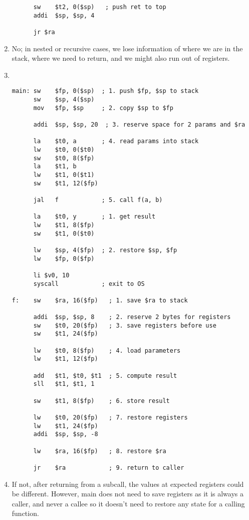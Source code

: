 \documentclass[12pt, a4paper]{article}
\begin{document}
\begin{enumerate}[Q\arabic*.]
\begin{lstlisting}
      sw    $t2, 0($sp)   ; push ret to top
      addi  $sp, $sp, 4

      jr $ra
    \end{lstlisting}

\pagebreak

  \item No; in nested or recursive cases, we lose information of where we are in the stack, where we need to return, and we might also run out of registers.

  \item \quad\\
\begin{lstlisting}
main: sw    $fp, 0($sp)  ; 1. push $fp, $sp to stack
      sw    $sp, 4($sp)  
      mov   $fp, $sp     ; 2. copy $sp to $fp 

      addi  $sp, $sp, 20  ; 3. reserve space for 2 params and $ra

      la    $t0, a       ; 4. read params into stack
      lw    $t0, 0($t0)  
      sw    $t0, 8($fp)  
      la    $t1, b 
      lw    $t1, 0($t1)  
      sw    $t1, 12($fp)

      jal   f            ; 5. call f(a, b)

      la    $t0, y       ; 1. get result
      lw    $t1, 8($fp)      
      sw    $t1, 0($t0)  

      lw    $sp, 4($fp)  ; 2. restore $sp, $fp
      lw    $fp, 0($fp)

      li $v0, 10  
      syscall            ; exit to OS

f:    sw    $ra, 16($fp)   ; 1. save $ra to stack

      addi  $sp, $sp, 8    ; 2. reserve 2 bytes for registers
      sw    $t0, 20($fp)   ; 3. save registers before use
      sw    $t1, 24($fp)

      lw    $t0, 8($fp)    ; 4. load parameters
      lw    $t1, 12($fp)

      add   $t1, $t0, $t1  ; 5. compute result
      sll   $t1, $t1, 1   

      sw    $t1, 8($fp)    ; 6. store result

      lw    $t0, 20($fp)   ; 7. restore registers
      lw    $t1, 24($fp)
      addi  $sp, $sp, -8

      lw    $ra, 16($fp)   ; 8. restore $ra

      jr    $ra            ; 9. return to caller
\end{lstlisting}

  \item If not, after returning from a subcall, the values at expected registers could be different. However, main  does not need to save registers as it is always a caller, and never a callee so it doesn't need to restore any state for a calling function.


\end{enumerate}
\end{document}
